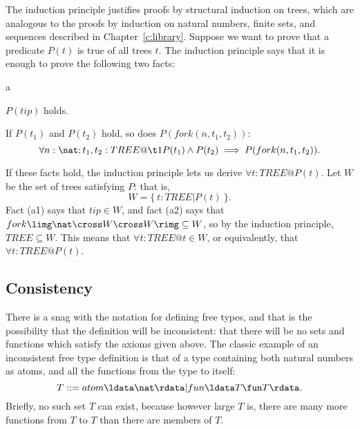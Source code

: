 The induction principle justifies proofs by structural
induction on trees, which are analogous to
the proofs by induction on natural numbers, finite sets, and sequences
described in Chapter~\ref{c:library}. Suppose we want to prove that a
predicate $P(t)$ is true of all trees $t$.  The induction principle
says that it is enough to prove the following two facts:
\begin{oblig}{a}
\item $P(tip)$ holds.

\item If $P(t_1)$ and $P(t_2)$ hold, so does $P(fork(n,t_1,t_2))$:
        \[ \forall n: \nat; t_1, t_2: TREE @ \\
	\t1	P(t_1) \land P(t_2) \implies P(fork(n,t_1,t_2)). \]
\end{oblig}
If these facts hold, the induction principle lets us derive
$\forall t : TREE @ P(t)$.  Let $W$ be the set of trees satisfying
$P$: that is,
\[ W = \{~t: TREE | P(t)~\}. \]
Fact (a1) says that $tip \in W$, and fact (a2) says that
$fork\limg \nat \cross W \cross W\rimg \subseteq W$, so
by the induction principle, $TREE \subseteq W$.
This means that $\forall t: TREE @ t \in W$, or equivalently,
that $\forall t: TREE @ P(t)$.

\subsection{Consistency}\label{ss:consistency}

There is a snag with the notation for defining free types, and that is
the possibility that the definition will be inconsistent: that there
will be no sets and functions which satisfy the axioms given above.
The classic example of an inconsistent free type definition is that
of a type containing both natural numbers as atoms, and all the
functions from the type to itself:
\[ T ::= atom \ldata \nat \rdata | fun \ldata T \fun T \rdata. \]
Briefly, no such set $T$ can exist, because however large $T$
is, there are many more functions from $T$ to $T$ than there are
members of $T$.

